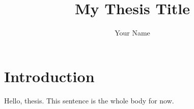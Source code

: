 \documentclass[11pt]{report}  %
\title{My Thesis Title}
\author{Your Name}
\begin{document}
\maketitle                    %
\tableofcontents              %

\chapter{Introduction}
Hello, thesis. This sentence is the whole body for now.
\end{document}
